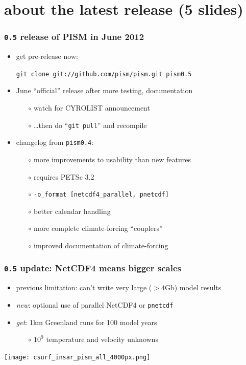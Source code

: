 \documentclass[hide notes,intlimits]{beamer}
\begin{document}
\section[latest release]{about the latest release  (5 slides)}

\begin{frame}
  \frametitle{\texttt{0.5} release of PISM in June 2012}

  \begin{itemize}
  \item get pre-release \alert{now}:
    \begin{center}
    \texttt{git clone git://github.com/pism/pism.git pism0.5}
    \end{center}
  \item June ``official'' release after more testing, documentation
    \begin{itemize}
    \item[$\circ$] watch for CYROLIST announcement
    \item[$\circ$] \dots then do ``\texttt{git pull}'' and recompile
    \end{itemize}
  \item changelog from \texttt{pism0.4}:
    \begin{itemize}
    \item[$\circ$] more improvements to usability than new features
    \item[$\circ$] requires PETSc 3.2
    \item[$\circ$] \texttt{-o\_format [netcdf4\_parallel, pnetcdf]}
    \item[$\circ$] better calendar handling
    \item[$\circ$] more complete climate-forcing ``couplers''
    \item[$\circ$] improved documentation of climate-forcing
    \end{itemize}
  \end{itemize}
\end{frame}


\begin{frame}
  \frametitle{\texttt{0.5} update: NetCDF4 means bigger scales}

\vspace{-1mm}
  \begin{itemize}
  \item previous limitation: can't write very large ($>4$Gb) model results
  \item \emph{new}: optional use of parallel NetCDF4 or \texttt{pnetcdf}
  \item \emph{get}: 1km Greenland runs for 100 model years
    \scriptsize
    \begin{itemize}
    \item[$\circ$] $10^9$ temperature and velocity unknowns
    \end{itemize}
    \normalsize
  \end{itemize}
  
    \vspace{-2mm}
    \begin{center}
    \texttt{[image: csurf\_insar\_pism\_all\_4000px.png]}
    \end{center}
\end{frame}
\end{document}
